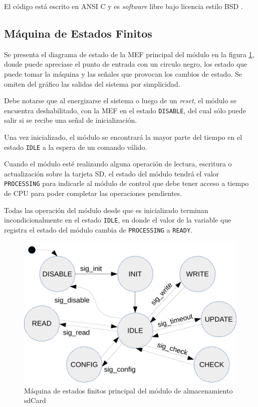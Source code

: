 
El código está escrito en ANSI C y es \textit{software} libre bajo licencia estilo BSD \citep{BSD}.

\subsection{Máquina de Estados Finitos}
\label{subsec:MEFsdcard}

Se presenta el diagrama de estado de la MEF principal del módulo en la figura \ref{fig:mef_sdcard}, donde puede apreciase el punto de entrada con un circulo negro, los estado que puede tomar la máquina y las señales que provocan los cambios de estado. Se omiten del gráfico las salidas del sistema por simplicidad. 

Debe notarse que al energizarse el sistema o luego de un \textit{reset}, el módulo se encuentra deshabilitado, con la MEF en el estado \texttt{DISABLE}, del cual sólo puede salir si se recibe una señal de inicialización.  

Una vez inicializado, el módulo se encontrará la mayor parte del tiempo en el estado \texttt{IDLE} a la espera de un comando válido.  

Cuando el módulo esté realizando alguna operación de lectura, escritura o actualización sobre la tarjeta SD, el estado del módulo tendrá el valor \texttt{PROCESSING} para indicarle al módulo de control que debe tener acceso a tiempo de CPU para poder completar las operaciones pendientes.  

Todas las operación del módulo desde que es inicializado terminan incondicionalmente en el estado \texttt{IDLE}, en donde el valor de la variable que registra el estado del módulo cambia de \texttt{PROCESSING} a \texttt{READY}.

\begin{figure}[htpb]
	\centering
	\includegraphics[width=\textwidth]{./Figures/MEF_sdCard_2.pdf}
	\caption[MEF principal del módulo de almacenamiento sdCard]{Máquina de estados finitos principal del módulo de almacenamiento sdCard}
	\label{fig:mef_sdcard}
\end{figure}

